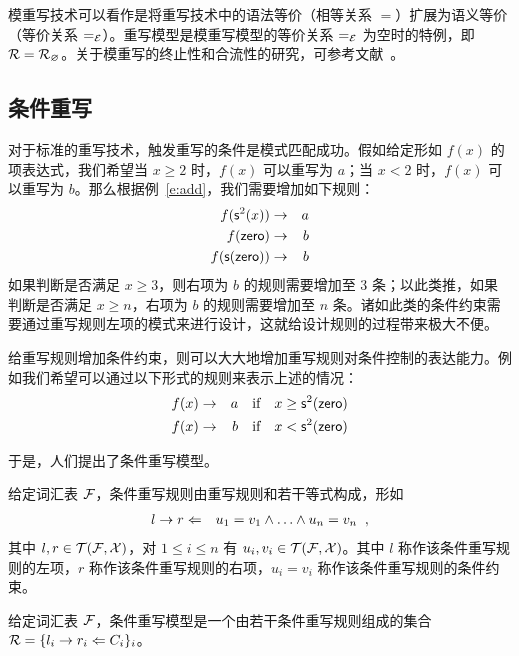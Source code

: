 模重写技术可以看作是将重写技术中的语法等价（相等关系 $=$）扩展为语义等价（等价关系 $=_{\mathcal{E}}$）。重写模型是模重写模型的等价关系 $=_{\mathcal{E}}$ 为空时的特例，即 $\mathcal{R} = \mathcal{R}_{\varnothing}$。关于模重写的终止性和合流性的研究，可参考文献~。


\subsection{条件重写}

对于标准的重写技术，触发重写的条件是模式匹配成功。假如给定形如 $f(x)$ 的项表达式，我们希望当 $x\ge 2$ 时，$f(x)$ 可以重写为 $a$；当 $x<2$ 时，$f(x)$ 可以重写为 $b$。那么根据例~\ref{e:add}，我们需要增加如下规则：
\begin{eqnarray}
f(\operatorname{\mathsf{s}}^2(x)) & \rightarrow & a \nonumber \\
f(\operatorname{\mathsf{zero}})  & \rightarrow & b \nonumber \\
f(\operatorname{\mathsf{s}}(\operatorname{\mathsf{zero}})) & \rightarrow & b \nonumber
\end{eqnarray}
如果判断是否满足 $x\ge 3$，则右项为 $b$ 的规则需要增加至 $3$ 条；以此类推，如果判断是否满足 $x\ge n$，右项为 $b$ 的规则需要增加至 $n$ 条。诸如此类的条件约束需要通过重写规则左项的模式来进行设计，这就给设计规则的过程带来极大不便。

给重写规则增加条件约束，则可以大大地增加重写规则对条件控制的表达能力。例如我们希望可以通过以下形式的规则来表示上述的情况：
\begin{eqnarray}
f(x) & \rightarrow & a ~~\mbox{ if }~~ x\ge \operatorname{\mathsf{s}}^2(\operatorname{\mathsf{zero}}) \nonumber \\
f(x)  & \rightarrow & b ~~\mbox{ if }~~ x < \operatorname{\mathsf{s}}^2(\operatorname{\mathsf{zero}}) \nonumber 
\end{eqnarray}

于是，人们提出了条件重写模型。

\begin{definition}[条件重写规则]
\label{d:crule}
给定词汇表 $\mathcal{F}$，条件重写规则由重写规则和若干等式构成，形如
\begin{eqnarray}
l \rightarrow r & \Leftarrow & u_1 = v_1 \land \ldots \land u_n = v_n \;\; ,\nonumber
\end{eqnarray}
其中 $l,r\in\mathcal{T}(\mathcal{F},\mathcal{X})$，对 $1\le i\le n$ 有 $u_i,v_i\in\mathcal{T}(\mathcal{F},\mathcal{X})$。其中 $l$ 称作该条件重写规则的左项，$r$ 称作该条件重写规则的右项，$u_i = v_i$ 称作该条件重写规则的条件约束。
\end{definition}

\begin{definition}
\label{d:crewrite-sys}
给定词汇表 $\mathcal{F}$，条件重写模型是一个由若干条件重写规则组成的集合 $\mathcal{R} = \{l_i \rightarrow r_i \Leftarrow C_i \}_i$。
\end{definition}

